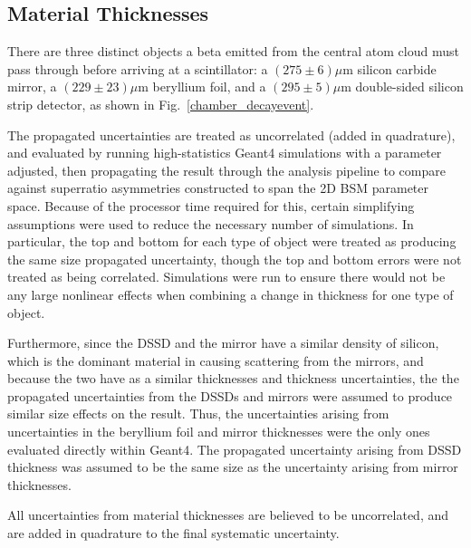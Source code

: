 \subsection{Material Thicknesses}
There are three distinct objects a beta emitted from the central atom cloud must pass through before arriving at a scintillator:  a $(275 \pm 6) \mu$m silicon carbide mirror, a $(229 \pm 23) \mu$m beryllium foil, and a $(295 \pm 5) \mu$m double-sided silicon strip detector, as shown in Fig.~\ref{chamber_decayevent}.~

The propagated uncertainties are treated as uncorrelated (added in quadrature), and evaluated by running high-statistics Geant4 simulations with a parameter adjusted, then propagating the result through the analysis pipeline to compare against superratio asymmetries constructed to span the 2D BSM parameter space.  Because of the processor time required for this, certain simplifying assumptions were used to reduce the necessary number of simulations.  In particular, the top and bottom for each type of object were treated as producing the same size propagated uncertainty, though the top and bottom errors were not treated as being correlated.  Simulations were run to ensure there would not be any large nonlinear effects when combining a change in thickness for one type of object.  

Furthermore, since the DSSD and the mirror have a similar density of silicon, which is the dominant material in causing scattering from the mirrors, and because the two have as a similar thicknesses and thickness uncertainties, the the propagated uncertainties from the DSSDs and mirrors were assumed to produce similar size effects on the result.  Thus, the uncertainties arising from uncertainties in the beryllium foil and mirror thicknesses were the only ones evaluated directly within Geant4.  The propagated uncertainty arising from DSSD thickness was assumed to be the same size as the uncertainty arising from mirror thicknesses.  

All uncertainties from material thicknesses are believed to be uncorrelated, and are added in quadrature to the final systematic uncertainty.  


 


